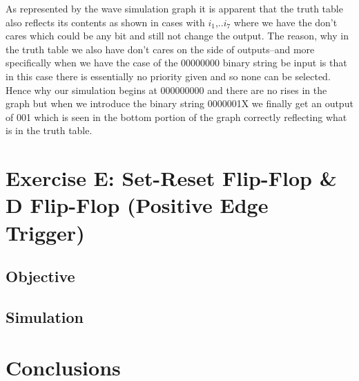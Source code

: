 \documentclass[12pt]{article}
\begin{document}
\noindent As represented by the wave simulation graph it is apparent that the truth table also reflects its contents as shown in cases with $i_1$,..$i_7$ where we have the don't cares which could be any bit and still not change the output. The reason, why in the truth table we also have don't cares on the side of outputs--and more specifically when we have the case of the 00000000 binary string be input is that in this case there is essentially no priority given and so none can be selected. Hence why our simulation begins at 000000000 and there are no rises in the graph but when we introduce the binary string 0000001X we finally get an output of 001 which is seen in the bottom portion of the graph correctly reflecting what is in the truth table.


\clearpage
\section{Exercise E: Set-Reset Flip-Flop \& D Flip-Flop (Positive Edge Trigger)}
\subsection{Objective}

\subsection{Simulation}

\section{Conclusions}
\end{document}
